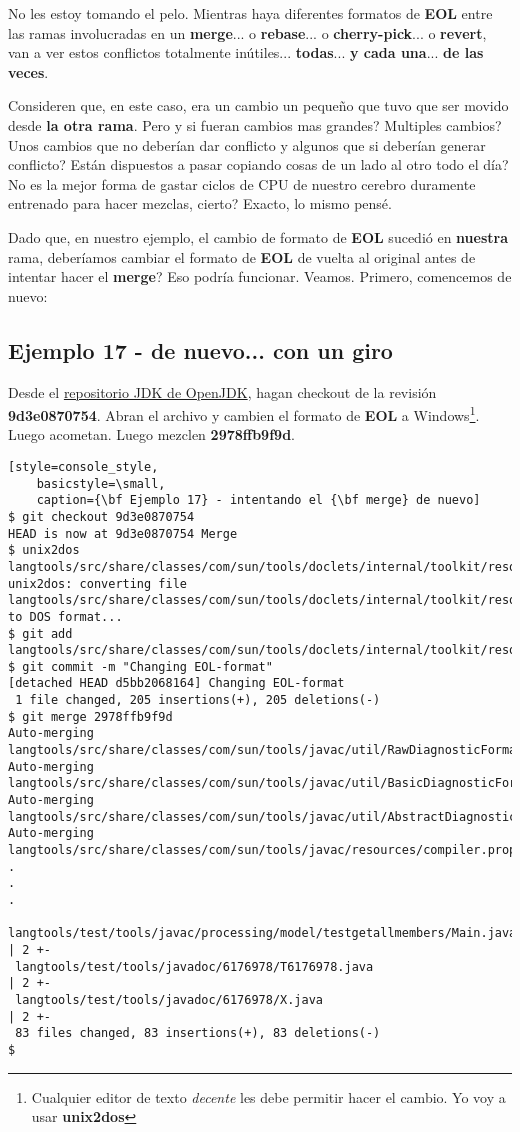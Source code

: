 No les estoy tomando el pelo. Mientras haya diferentes formatos de {\bf EOL} entre las ramas involucradas en un {\bf merge}... o {\bf rebase}...
o {\bf cherry-pick}... o {\bf revert}, van a ver estos conflictos totalmente inútiles... {\bf todas}... {\bf y cada una}... {\bf de las veces}.

Consideren que, en este caso, era un cambio un pequeño que tuvo que ser movido desde {\bf la otra rama}. Pero y si fueran cambios
mas grandes? Multiples cambios? Unos cambios que no deberían dar conflicto y algunos que si deberían generar conflicto? Están
dispuestos a pasar copiando cosas de un lado al otro todo el día? No es la mejor forma de gastar ciclos de CPU de nuestro
cerebro duramente entrenado para hacer mezclas, cierto? Exacto, lo mismo pensé.

Dado que, en nuestro ejemplo, el cambio de formato de {\bf EOL} sucedió en {\bf nuestra} rama, deberíamos cambiar el formato de {\bf EOL}
de vuelta al original antes de intentar hacer el {\bf merge}? Eso podría funcionar. Veamos. Primero, comencemos de nuevo:

\subsection{Ejemplo 17 - de nuevo... con un giro}

Desde el \hyperref[openjdk_repo]{repositorio JDK de OpenJDK}, hagan checkout de la revisión {\bf 9d3e0870754}. Abran el archivo
y cambien el formato de {\bf EOL} a Windows\footnote{Cualquier editor de texto {\it decente} les debe permitir hacer el cambio. Yo
voy a usar {\bf unix2dos}}. Luego acometan. Luego mezclen {\bf 2978ffb9f9d}.

\begin{lstlisting}[style=console_style,
	basicstyle=\small,
	caption={\bf Ejemplo 17} - intentando el {\bf merge} de nuevo]
$ git checkout 9d3e0870754
HEAD is now at 9d3e0870754 Merge
$ unix2dos langtools/src/share/classes/com/sun/tools/doclets/internal/toolkit/resources/doclet.xml
unix2dos: converting file langtools/src/share/classes/com/sun/tools/doclets/internal/toolkit/resources/doclet.xml to DOS format...
$ git add langtools/src/share/classes/com/sun/tools/doclets/internal/toolkit/resources/doclet.xml
$ git commit -m "Changing EOL-format"
[detached HEAD d5bb2068164] Changing EOL-format
 1 file changed, 205 insertions(+), 205 deletions(-)
$ git merge 2978ffb9f9d
Auto-merging langtools/src/share/classes/com/sun/tools/javac/util/RawDiagnosticFormatter.java
Auto-merging langtools/src/share/classes/com/sun/tools/javac/util/BasicDiagnosticFormatter.java
Auto-merging langtools/src/share/classes/com/sun/tools/javac/util/AbstractDiagnosticFormatter.java
Auto-merging langtools/src/share/classes/com/sun/tools/javac/resources/compiler.properties
.
.
.
 langtools/test/tools/javac/processing/model/testgetallmembers/Main.java                                | 2 +-
 langtools/test/tools/javadoc/6176978/T6176978.java                                                     | 2 +-
 langtools/test/tools/javadoc/6176978/X.java                                                            | 2 +-
 83 files changed, 83 insertions(+), 83 deletions(-)
$
\end{lstlisting}

